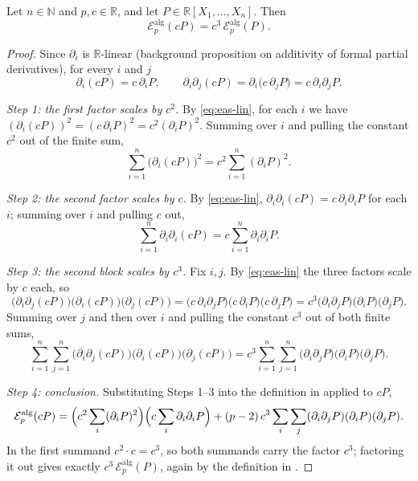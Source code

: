 \begin{lemma}
Let $n\in\mathbb{N}$ and $p,c\in\mathbb{R}$, and let
$P\in\mathbb{R}[X_1,\dots,X_n]$. Then
\[
  \mathcal{E}^{\mathrm{alg}}_p(cP)=c^3\,\mathcal{E}^{\mathrm{alg}}_p(P).
\]
\end{lemma}
\begin{proof}
Since $\partial_i$ is $\mathbb{R}$-linear (background proposition on additivity
of formal partial derivatives), for every $i$ and $j$
\begin{equation}\label{eq:eas-lin}
  \partial_i(cP)=c\,\partial_iP,
  \qquad
  \partial_i\partial_j(cP)=\partial_i\bigl(c\,\partial_jP\bigr)
   =c\,\partial_i\partial_jP .
\end{equation}

\emph{Step 1: the first factor scales by $c^2$.} By \eqref{eq:eas-lin}, for each
$i$ we have $(\partial_i(cP))^2=(c\,\partial_iP)^2=c^2(\partial_iP)^2$. Summing
over $i$ and pulling the constant $c^2$ out of the finite sum,
\[
  \sum_{i=1}^{n}\bigl(\partial_i(cP)\bigr)^2
  =c^2\sum_{i=1}^{n}(\partial_iP)^2 .
\]

\emph{Step 2: the second factor scales by $c$.} By \eqref{eq:eas-lin},
$\partial_i\partial_i(cP)=c\,\partial_i\partial_iP$ for each $i$; summing over
$i$ and pulling $c$ out,
\[
  \sum_{i=1}^{n}\partial_i\partial_i(cP)
  =c\sum_{i=1}^{n}\partial_i\partial_iP .
\]

\emph{Step 3: the second block scales by $c^3$.} Fix $i,j$. By
\eqref{eq:eas-lin} the three factors scale by $c$ each, so
\[
  \bigl(\partial_i\partial_j(cP)\bigr)\bigl(\partial_i(cP)\bigr)\bigl(\partial_j(cP)\bigr)
  =\bigl(c\,\partial_i\partial_jP\bigr)\bigl(c\,\partial_iP\bigr)\bigl(c\,\partial_jP\bigr)
  =c^3\bigl(\partial_i\partial_jP\bigr)\bigl(\partial_iP\bigr)\bigl(\partial_jP\bigr).
\]
Summing over $j$ and then over $i$ and pulling the constant $c^3$ out of both
finite sums,
\[
  \sum_{i=1}^{n}\sum_{j=1}^{n}
    \bigl(\partial_i\partial_j(cP)\bigr)\bigl(\partial_i(cP)\bigr)\bigl(\partial_j(cP)\bigr)
  =c^3\sum_{i=1}^{n}\sum_{j=1}^{n}
    \bigl(\partial_i\partial_jP\bigr)\bigl(\partial_iP\bigr)\bigl(\partial_jP\bigr).
\]

\emph{Step 4: conclusion.} Substituting Steps 1--3 into the definition in
 applied to $cP$,
\[
  \mathcal{E}^{\mathrm{alg}}_p(cP)
  =\Bigl(c^2\sum_i(\partial_iP)^2\Bigr)\Bigl(c\sum_i\partial_i\partial_iP\Bigr)
   +(p-2)\,c^3\sum_i\sum_j(\partial_i\partial_jP)(\partial_iP)(\partial_jP).
\]
In the first summand $c^2\cdot c=c^3$, so both summands carry the factor $c^3$;
factoring it out gives exactly $c^3\,\mathcal{E}^{\mathrm{alg}}_p(P)$, again by
the definition in .
\end{proof}
